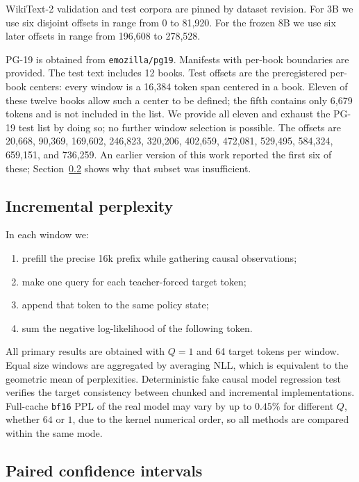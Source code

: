\documentclass[10pt,twocolumn]{article}
\newcommand{\wikitext}{WikiText-2}
\newcommand{\pg}{PG-19}
\begin{document}
\wikitext{} validation and test corpora are pinned by dataset revision.
For 3B we use six disjoint offsets in range from 0 to 81,920. For the frozen
8B we use six later offsets in range from 196,608 to 278,528.

\pg{} is obtained from \texttt{emozilla/pg19}. Manifests with per-book boundaries
are provided. The test text includes 12 books. Test offsets are the
preregistered per-book centers: every window is a 16,384 token span centered
in a book. Eleven of these twelve books allow such a center to be defined; the
fifth contains only 6,679 tokens and is not included in the list. We provide all
eleven and exhaust the \pg{} test list by doing so; no further window
selection is possible. The offsets are 20,668, 90,369, 169,602, 246,823, 320,206, 402,659,
472,081, 529,495, 584,324, 659,151, and 736,259. An earlier version of this
work reported the first six of these; Section~\ref{sec:paired} shows why that
subset was insufficient.
\subsection{Incremental perplexity}

In each window we:

\begin{enumerate}\itemsep1pt
\item prefill the precise 16k prefix while gathering causal observations;
\item make one query for each teacher-forced target token;
\item append that token to the same policy state;
\item sum the negative log-likelihood of the following token.
\end{enumerate}

All primary results are obtained with $Q=1$ and 64 target tokens per window. Equal size
windows are aggregated by averaging NLL, which is equivalent to the geometric
mean of perplexities. Deterministic fake causal model regression test verifies
the target consistency between chunked and incremental implementations. Full-cache \texttt{bf16}
PPL of the real model may vary by up to $0.45\%$ for different $Q$, whether $64$ or $1$,
due to the kernel numerical order, so all methods are compared within the same mode.

\subsection{Paired confidence intervals}
\label{sec:paired}
\end{document}
